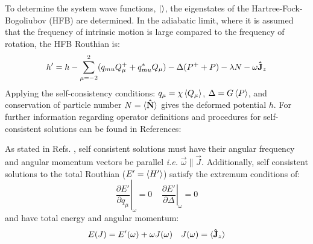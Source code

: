 To determine the system wave functions,  $\ket{}$, the eigenstates of the Hartree-Fock-Bogoliubov (HFB) are determined. In the adiabatic limit, where it is assumed that the frequency of intrinsic motion is large compared to the frequency of rotation, the HFB Routhian is:
\begin{equation}
\label{eqn:chp2-TAC-HFB-Routhian}
h'=h - \sum\limits_{\mu=-2}^{2}(q_{mu}Q^+_{\mu}+q^*_{mu}Q_{\mu}) - \Delta(P^++P) - \lambda{}N-\omega\boldsymbol{\hat{\textbf{J}}}_z
\end{equation}
Applying the self-consistency conditions: $q_{\mu}=\chi{}\braket{Q_{\mu}}$, $\Delta=G\braket{P}$, and conservation of particle number $N=\braket{\boldsymbol{\hat{\textbf{N}}}}$ gives the deformed potential $h$. For further information regarding operator definitions and procedures for self-consistent solutions can be found in References: \cite{frauendorfTACMultiQPBands,frauendorfTAC,nuclearManyBodyProblem}

As stated in Refs. \cite{frauendorfTACMultiQPBands,timeDepVarMethodForRotation}, self consistent solutions must have their angular frequency and angular momentum vectors be parallel \emph{i.e.} $\vec{\omega}\parallel\vec{J}$. Additionally, self consistent solutions to the total Routhian ($E'=\braket{H'}$) satisfy the extremum conditions of:
\begin{equation}
\label{eqn:chp2-tac-extrema-cond}
\left. \frac{\partial{}E'}{\partial{}q_{\mu}} \right|_{\omega}=0 ~~~~~ \left. \frac{\partial{}E'}{\partial{}\Delta} \right|_{\omega}=0
\end{equation}
and have total energy and angular momentum:
\begin{align}
E(J)=E'(\omega)+\omega{}J(\omega) & & J(\omega) = \braket{\boldsymbol{\hat{\textbf{J}}}_z}
\end{align}

